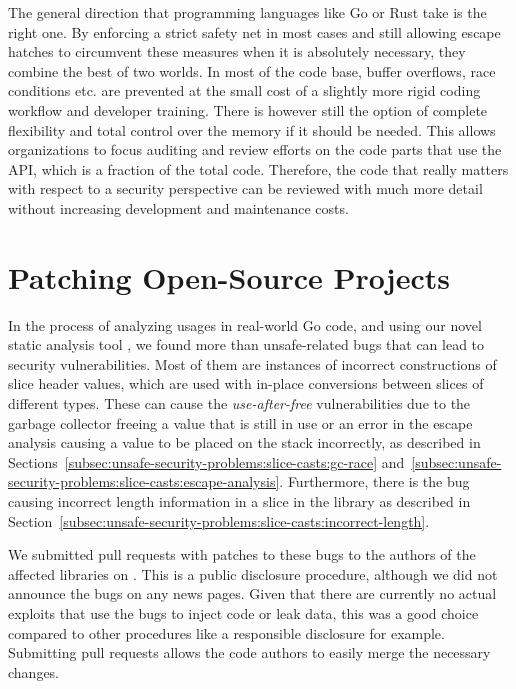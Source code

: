 The general direction that programming languages like Go or Rust take is the right one.
By enforcing a strict safety net in most cases and still allowing escape hatches to circumvent these measures when it is
absolutely necessary, they combine the best of two worlds.
In most of the code base, buffer overflows, race conditions etc. are prevented at the small cost of a slightly more
rigid coding workflow and developer training.
There is however still the option of complete flexibility and total control over the memory if it should be needed.
This allows organizations to focus auditing and review efforts on the code parts that use the \unsafe{} \acrshort{API},
which is a fraction of the total code.
Therefore, the code that really matters with respect to a security perspective can be reviewed with much more detail
without increasing development and maintenance costs.



\section{Patching Open-Source Projects}\label{sec:discussion:patches}

In the process of analyzing \unsafe{} usages in real-world Go code, and using our novel static analysis tool
\toolSafer{}, we found more than \numberBugsFixedRounded{} unsafe-related bugs that can lead to security
vulnerabilities.
Most of them are instances of incorrect constructions of slice header values, which are used with in-place conversions
between slices of different types.
These can cause the \textit{use-after-free} vulnerabilities due to the garbage collector freeing a value that is still
in use or an error in the escape analysis causing a value to be placed on the stack incorrectly, as described in
Sections~\ref{subsec:unsafe-security-problems:slice-casts:gc-race}
and~\ref{subsec:unsafe-security-problems:slice-casts:escape-analysis}.
Furthermore, there is the bug causing incorrect length information in a slice in the \goFuse{} library as described in
Section~\ref{subsec:unsafe-security-problems:slice-casts:incorrect-length}.

We submitted \numberPRs{} pull requests with patches to these bugs to the authors of the affected libraries on
\github{}.
This is a public disclosure procedure, although we did not announce the bugs on any news pages.
Given that there are currently no actual exploits that use the bugs to inject code or leak data, this was a good choice
compared to other procedures like a responsible disclosure for example.
Submitting \github{} pull requests allows the code authors to easily merge the necessary changes.

